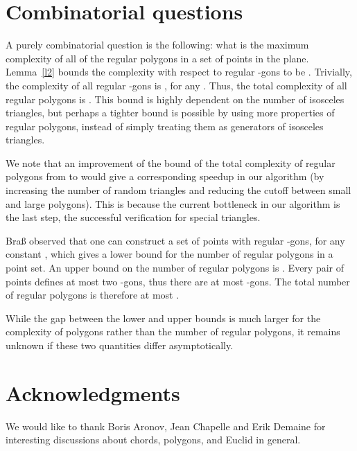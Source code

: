 \documentclass{article}
\begin{document}
\section{Combinatorial questions}

A purely combinatorial question is the following: what is the maximum complexity of all of the regular polygons in a set of  points in the plane.
Lemma~\ref{l2} bounds the complexity with respect to regular -gons to be . Trivially, the complexity of all regular -gons is , for any . Thus, the total complexity of all regular polygons is . This bound is highly dependent on the number of isosceles triangles, but perhaps a tighter bound is possible by using more properties of regular polygons, instead of simply treating them as generators of isosceles triangles.

We note that an improvement of the bound of the total complexity of regular polygons from  to  would give a corresponding speedup in our algorithm (by increasing the number of random triangles and reducing the cutoff between small and large polygons). This is because the current bottleneck in our algorithm is the last step, the successful verification for special triangles.


Bra{\ss} observed that one can construct a set of points with  regular -gons, for any constant , which gives a lower bound  for the number of regular polygons in a point set. An upper bound on the number of regular polygons is . Every pair of points defines at most two -gons, thus there are at most  -gons.  The total number of regular polygons is  therefore at most .

While the gap between the lower and upper bounds is much larger for the complexity of polygons rather than the number of regular polygons, it remains unknown if  these two quantities differ asymptotically.
\section{Acknowledgments}

We would like to thank Boris Aronov, Jean Chapelle and Erik Demaine for
interesting discussions about chords, polygons, and Euclid in general.
\end{document}
